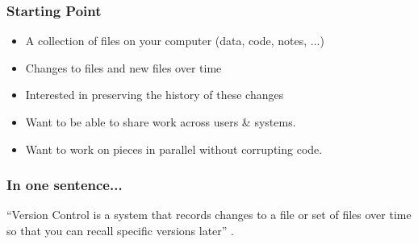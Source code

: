 
\begin{frame}
    \frametitle{Starting Point}

    \begin{itemize}
        \item A collection of files on your computer (data, code, notes, ...)
        \item Changes to files and new files over time
        \item Interested in preserving the history 
        of these changes
        \item Want to be able to share work across users \& systems.
        \item Want to work on pieces in parallel without corrupting code.
    \end{itemize}
\end{frame}

\begin{frame}
    \frametitle{In one sentence...}
    ``Version Control is a system that records changes to a file or set of files
    over time so that you can recall specific versions later'' \citep{ChaconHamano2009}.
\end{frame}

